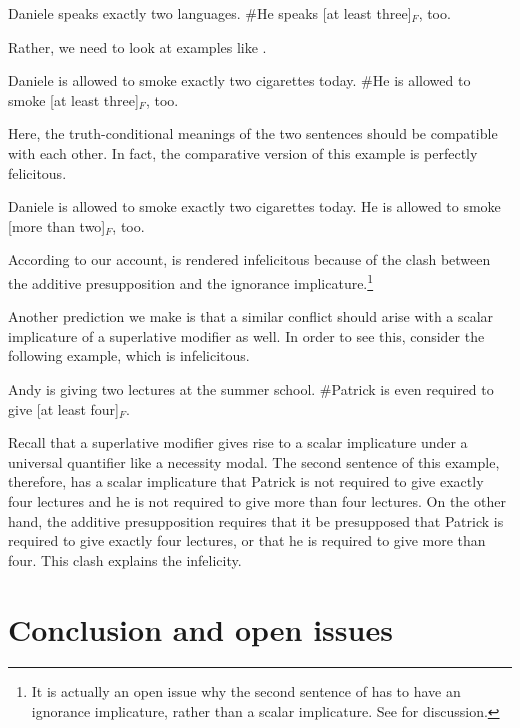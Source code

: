 \documentclass[output=paper]{langscibook}
\begin{document}
    \ea Daniele speaks exactly two languages. \#He speaks [at least three]$_F$, too.\z

\noindent Rather, we need to look at examples like .

    \ea Daniele is allowed to smoke exactly two cigarettes today. \#He is allowed to smoke [at least three]$_F$, too.\label{don-sud:daniele}\z

\noindent Here, the truth-conditional meanings of the two sentences should be compatible with each other. In fact, the comparative version of this example is perfectly felicitous.

    \ea Daniele is allowed to smoke exactly two cigarettes today. He is allowed to smoke [more than two]$_F$, too.\z

\noindent According to our account,  is rendered infelicitous because of the clash between the additive presupposition and the ignorance implicature.\footnote{It is actually an open issue why the second sentence of  has to have an ignorance implicature, rather than a scalar implicature. See \citet{buccolahaida:18} for discussion.}

Another prediction we make is that a similar conflict should arise with a scalar implicature of a superlative modifier as well. In order to see this, consider the following example, which is infelicitous.

    \ea
    Andy is giving two lectures at the summer school.
    \#Patrick is even required to give [at least four]$_F$.
    \z

\noindent Recall that a superlative modifier gives rise to a scalar implicature under a universal quantifier like a necessity modal. The second sentence of this example, therefore, has a scalar implicature that Patrick is not required to give exactly four lectures and he is not required to give more than four lectures. On the other hand, the additive presupposition requires that it be presupposed that Patrick is required to give exactly four lectures, or that he is required to give more than four. This clash explains the infelicity.

  
 \section{Conclusion and open issues}
 \label{don-sud:sec:conclusion}
\end{document}
